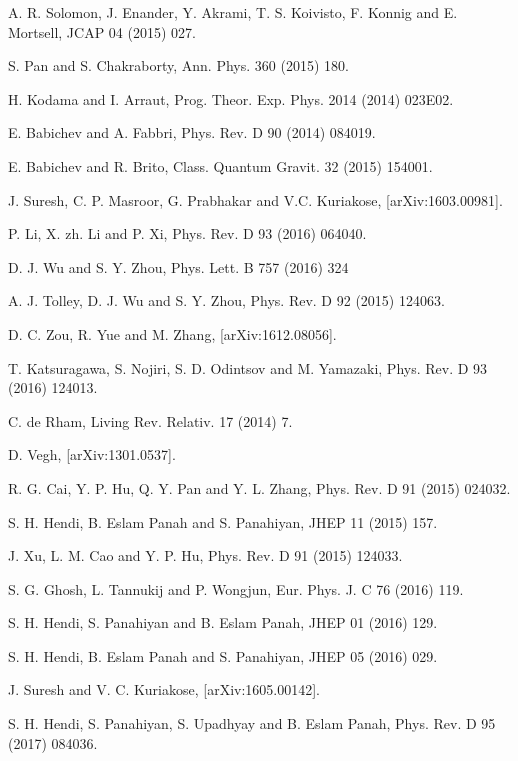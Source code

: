 \documentclass[aps]{revtex4}
\begin{document}
\begin{thebibliography}{999}
 A. R. Solomon, J. Enander, Y. Akrami, T. S. Koivisto, F.
Konnig and E. Mortsell, JCAP 04 (2015) 027.

 S. Pan and S. Chakraborty, Ann. Phys. 360 (2015) 180.

 H. Kodama and I. Arraut, Prog. Theor. Exp. Phys.
2014 (2014) 023E02.

 E. Babichev and A. Fabbri, Phys. Rev. D 90 (2014) 084019.

 E. Babichev and R. Brito, Class. Quantum Gravit. 32
(2015) 154001.

 J. Suresh, C. P. Masroor, G. Prabhakar and V.C.
Kuriakose, [arXiv:1603.00981].

 P. Li, X. zh. Li and P. Xi, Phys. Rev. D 93 (2016) 064040.


 D. J. Wu and S. Y. Zhou, Phys. Lett. B 757 (2016) 324

 A. J. Tolley, D. J. Wu and S. Y. Zhou, Phys. Rev. D 92 (2015)
124063.

 D. C. Zou, R. Yue and M. Zhang, [arXiv:1612.08056].

 T. Katsuragawa, S. Nojiri, S. D. Odintsov and M.
Yamazaki, Phys. Rev. D 93 (2016) 124013.

 C. de Rham, Living Rev. Relativ. 17 (2014) 7.

 D. Vegh, [arXiv:1301.0537].

 R. G. Cai, Y. P. Hu, Q. Y. Pan and Y. L. Zhang, Phys. Rev.
D 91 (2015) 024032.

 S. H. Hendi, B. Eslam Panah and S. Panahiyan, JHEP
11 (2015) 157.

 J. Xu, L. M. Cao and Y. P. Hu, Phys. Rev. D 91 (2015) 124033.

 S. G. Ghosh, L. Tannukij and P. Wongjun, Eur. Phys. J. C
76 (2016) 119.

 S. H. Hendi, S. Panahiyan and B. Eslam Panah, JHEP 01
(2016) 129.

 S. H. Hendi, B. Eslam Panah and S. Panahiyan, JHEP
05 (2016) 029.

 J. Suresh and V. C. Kuriakose, [arXiv:1605.00142].

 S. H. Hendi, S. Panahiyan, S. Upadhyay and B. Eslam Panah, Phys. Rev. D 95 (2017) 084036.


\end{thebibliography}
\end{document}
